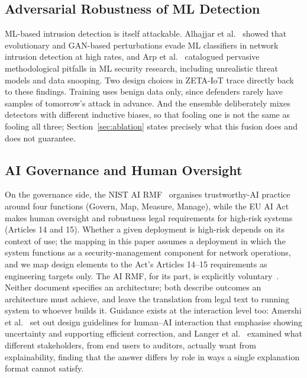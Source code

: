 \documentclass[sigconf,review,anonymous]{acmart}
\begin{document}
\subsection{Adversarial Robustness of ML Detection}
ML-based intrusion detection is itself attackable. Alhajjar et al.~\cite{alhajjar2021} showed that evolutionary and GAN-based perturbations evade ML classifiers in network intrusion detection at high rates, and Arp et al.~\cite{arp2022dodo} catalogued pervasive methodological pitfalls in ML security research, including unrealistic threat models and data snooping. Two design choices in ZETA-IoT trace directly back to these findings. Training uses benign data only, since defenders rarely have samples of tomorrow's attack in advance. And the ensemble deliberately mixes detectors with different inductive biases, so that fooling one is not the same as fooling all three; Section~\ref{sec:ablation} states precisely what this fusion does and does not guarantee.

\subsection{AI Governance and Human Oversight}
On the governance side, the NIST AI RMF~\cite{nistairmf} organises trustworthy-AI practice around four functions (Govern, Map, Measure, Manage), while the EU AI Act~\cite{euaiact} makes human oversight and robustness legal requirements for high-risk systems (Articles 14 and 15). Whether a given deployment is high-risk depends on its context of use; the mapping in this paper assumes a deployment in which the system functions as a security-management component for network operations, and we map design elements to the Act's Articles 14--15 requirements as engineering targets only. The AI RMF, for its part, is explicitly voluntary~\cite{nistairmfvoluntary}. Neither document specifies an architecture; both describe outcomes an architecture must achieve, and leave the translation from legal text to running system to whoever builds it. Guidance exists at the interaction level too: Amershi et al.~\cite{amershi2019} set out design guidelines for human--AI interaction that emphasise showing uncertainty and supporting efficient correction, and Langer et al.~\cite{langer2021} examined what different stakeholders, from end users to auditors, actually want from explainability, finding that the answer differs by role in ways a single explanation format cannot satisfy.
\end{document}
